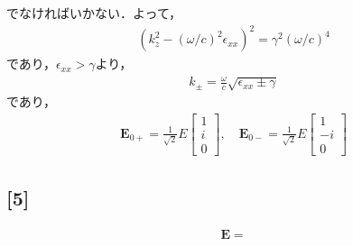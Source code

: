 \documentclass[12pt,dvipdfmx]{jsarticle}
\begin{document}
でなければいかない．よって，
\begin{eqnarray}
  (k_z^2- (\omega/c)^2\epsilon_{xx})^2 = \gamma^2 (\omega/c)^4
\end{eqnarray}
であり，$\epsilon_{xx}>\gamma$より，
\begin{eqnarray}
  k_{\pm} = \frac{\omega}{c}\sqrt{ \epsilon_{xx}\pm \gamma }
\end{eqnarray}
であり，
\begin{eqnarray}
  \bm{E}_{0+} = \frac{1}{\sqrt{2}}E
  \begin{bmatrix}
    1 \\
    i\\
    0
  \end{bmatrix}, \quad
  \bm{E}_{0-} = \frac{1}{\sqrt{2}}E
  \begin{bmatrix}
    1 \\
    -i\\
    0
  \end{bmatrix}
\end{eqnarray}
\subsection*{\large{[5]}}
\begin{eqnarray}
  \bm{E} = 
\end{eqnarray}
\end{document}
